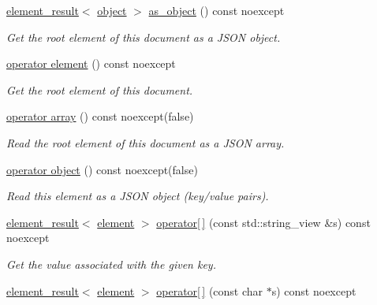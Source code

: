 \begin{DoxyCompactItemize}
\mbox{\label{classsimdjson_1_1document_a6479742459976d00a00c6eacfaadae26}} 
\hyperlink{classsimdjson_1_1document_1_1element__result}{element\+\_\+result}$<$ \hyperlink{classsimdjson_1_1document_1_1object}{object} $>$ \hyperlink{classsimdjson_1_1document_a6479742459976d00a00c6eacfaadae26}{as\+\_\+object} () const noexcept
\begin{DoxyCompactList}\small\item\em Get the root element of this document as a J\+S\+ON object. \end{DoxyCompactList}\item 
\mbox{\label{classsimdjson_1_1document_a563d11b1d2c2ac16f44e3403f3767964}} 
\hyperlink{classsimdjson_1_1document_a563d11b1d2c2ac16f44e3403f3767964}{operator element} () const noexcept
\begin{DoxyCompactList}\small\item\em Get the root element of this document. \end{DoxyCompactList}\item 
\hyperlink{classsimdjson_1_1document_aaa5e5da59a1c43f6936f4f5eab35a387}{operator array} () const noexcept(false)
\begin{DoxyCompactList}\small\item\em Read the root element of this document as a J\+S\+ON array. \end{DoxyCompactList}\item 
\hyperlink{classsimdjson_1_1document_ada83cc5e02ba0f46d5d88e347bd119c1}{operator object} () const noexcept(false)
\begin{DoxyCompactList}\small\item\em Read this element as a J\+S\+ON object (key/value pairs). \end{DoxyCompactList}\item 
\hyperlink{classsimdjson_1_1document_1_1element__result}{element\+\_\+result}$<$ \hyperlink{classsimdjson_1_1document_1_1element}{element} $>$ \hyperlink{classsimdjson_1_1document_ad986ccb287bf2c75697dbc90b3246090}{operator\mbox{[}$\,$\mbox{]}} (const std\+::string\+\_\+view \&s) const noexcept
\begin{DoxyCompactList}\small\item\em Get the value associated with the given key. \end{DoxyCompactList}\item 
\hyperlink{classsimdjson_1_1document_1_1element__result}{element\+\_\+result}$<$ \hyperlink{classsimdjson_1_1document_1_1element}{element} $>$ \hyperlink{classsimdjson_1_1document_a6fb3f0bf2ff7c1453c05f43132ba112e}{operator\mbox{[}$\,$\mbox{]}} (const char $\ast$s) const noexcept

\end{DoxyCompactItemize}
